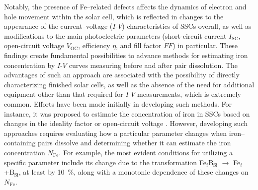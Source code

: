 \documentclass[a4paper,fleqn]{cas-sc}
\begin{document}
Notably, the presence of Fe--related defects affects the dynamics of electron and hole movement within the solar cell,
which is reflected in changes to the appearance of the current--voltage ($I$-$V$) characteristics of SSCs overall,
as well as modifications to the main photoelectric parameters
(short-circuit current  $I_\mathrm{SC}$,
open-circuit voltage $V_\mathrm{OC}$,
efficiency $\eta$, and fill factor $FF$)
in particular.
These findings create fundamental possibilities to advance methods for estimating iron concentration by $I$-$V$ curves measuring before and after pair dissolution.
The advantages of such an approach are associated with the possibility of directly characterizing finished solar cells,
as well as the absence of the need for additional equipment other than that required for $I$-$V$ measurements, which is extremely common.
Efforts have been made initially in developing such methods.
For instance, it was proposed to estimate the concentration of iron in SSCs based on changes in the ideality factor \cite{Olikh2019SM,Olikh2022PPV}
or open-circuit voltage \cite{Herguth2022}.
However, developing such approaches requires evaluating how a particular parameter changes when iron--containing pairs dissolve
and determining whether it can estimate the iron concentration $N_\mathrm{Fe}$.
For example, the most evident conditions for utilizing a specific parameter include its change due to the transformation
Fe$_i$B$_\mathrm{Si}$ $\rightarrow$ Fe$_i$ +B$_\mathrm{Si}$,
at least by 10~\%, along with a monotonic dependence of these changes on $N_\mathrm{Fe}$.
\end{document}
